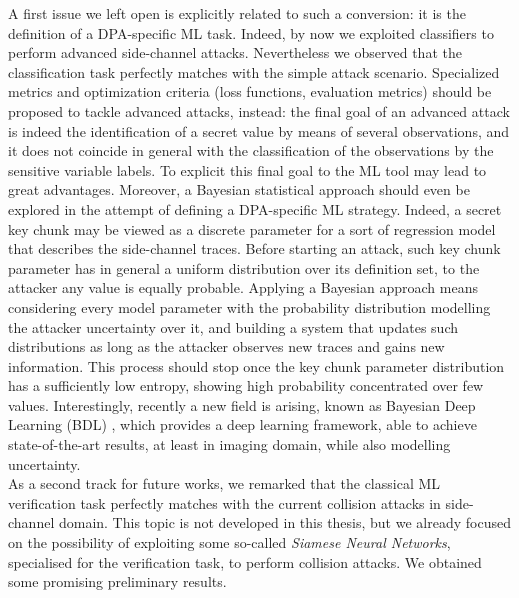 A first issue we left open is explicitly related to such a conversion: it is the definition of a DPA-specific ML task. Indeed, by now we exploited classifiers to perform advanced side-channel attacks. Nevertheless we observed that the classification task perfectly matches with the simple attack scenario. Specialized metrics and optimization criteria (\eg loss functions, evaluation metrics) should be proposed to tackle advanced attacks, instead: the final goal of an advanced attack is indeed the identification of a secret value by means of several observations, and it does not coincide in general with the classification of the observations by the sensitive variable labels. To explicit this final goal to the ML tool may lead to great advantages. Moreover, a Bayesian statistical approach should even be explored in the attempt of defining a DPA-specific ML strategy. Indeed, a secret key chunk may be viewed as a discrete parameter for a sort of regression model that describes the side-channel traces. Before starting an attack, such key chunk parameter has  in general a uniform distribution over its definition set, \ie to the attacker any value is equally probable. Applying a Bayesian approach means considering every model parameter with the probability distribution modelling the attacker uncertainty over it, and building a system that updates such distributions as long as the attacker observes new traces and gains new information. This process should stop once the key chunk parameter distribution has a sufficiently low entropy, showing high probability concentrated over few values. Interestingly, recently a new field is arising, known as Bayesian Deep Learning (BDL) \cite{gal2016uncertainty}, which provides a deep learning framework, able to achieve state-of-the-art results, at least in imaging domain, while also modelling uncertainty. \\


As a second track for future works, we remarked that the classical ML verification task perfectly matches with the current collision attacks in side-channel domain. This topic is not developed in this thesis, but we already focused on the possibility of exploiting some so-called \emph{Siamese Neural Networks}, specialised for the verification task, to perform collision attacks. We obtained some promising preliminary results. \\

